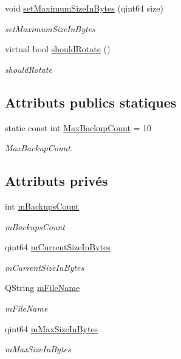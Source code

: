 \begin{DoxyCompactItemize}
void \hyperlink{classQsLogging_1_1SizeRotationStrategy_a3d37fd3bcc5aa4a84f8bf30af1d17526}{set\-Maximum\-Size\-In\-Bytes} (qint64 size)
\begin{DoxyCompactList}\small\item\em set\-Maximum\-Size\-In\-Bytes \end{DoxyCompactList}\item 
virtual bool \hyperlink{classQsLogging_1_1SizeRotationStrategy_aced9d2191e48ae60f039d62fd9c7197f}{should\-Rotate} ()
\begin{DoxyCompactList}\small\item\em should\-Rotate \end{DoxyCompactList}\end{DoxyCompactItemize}
\subsection*{Attributs publics statiques}
\begin{DoxyCompactItemize}
\item 
static const int \hyperlink{classQsLogging_1_1SizeRotationStrategy_a9965384f7b98b191d00eef62b2b417bf}{Max\-Backup\-Count} = 10
\begin{DoxyCompactList}\small\item\em Max\-Backup\-Count. \end{DoxyCompactList}\end{DoxyCompactItemize}
\subsection*{Attributs privés}
\begin{DoxyCompactItemize}
\item 
int \hyperlink{classQsLogging_1_1SizeRotationStrategy_a8ffbf6fc9110b82a399c90ce725023e9}{m\-Backups\-Count}
\begin{DoxyCompactList}\small\item\em m\-Backups\-Count \end{DoxyCompactList}\item 
qint64 \hyperlink{classQsLogging_1_1SizeRotationStrategy_a655f57a77d5e6384c49a2dffd899ef33}{m\-Current\-Size\-In\-Bytes}
\begin{DoxyCompactList}\small\item\em m\-Current\-Size\-In\-Bytes \end{DoxyCompactList}\item 
Q\-String \hyperlink{classQsLogging_1_1SizeRotationStrategy_a2a7187b9a1e4d957a9d5718c91a7f1b3}{m\-File\-Name}
\begin{DoxyCompactList}\small\item\em m\-File\-Name \end{DoxyCompactList}\item 
qint64 \hyperlink{classQsLogging_1_1SizeRotationStrategy_ab9b1ed9b39de4c90762f38a32935fe01}{m\-Max\-Size\-In\-Bytes}
\begin{DoxyCompactList}\small\item\em m\-Max\-Size\-In\-Bytes \end{DoxyCompactList}\end{DoxyCompactItemize}


